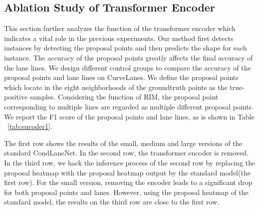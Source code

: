 \documentclass[10pt,twocolumn,letterpaper]{article}
\begin{document}
\subsection{Ablation Study of Transformer Encoder}

\begin{table}[h]
\centering
{}
\caption{Ablation study of the transformer encoder module on CurveLanes.}
\label{tab:encoder1}
\end{table}
This section further analyzes the function of the transformer encoder which indicates a vital role in the previous experiments. Our method first detects instances by detecting the proposal points and then predicts the shape for each instance. The accuracy of the proposal points greatly affects the final accuracy of the lane lines.
We design different control groups to compare the accuracy of the proposal points and lane lines on CurveLanes. We define the proposal points which locate in the eight neighborhoods of the groundtruth points as the true-positive samples. Considering the function of RIM, the proposal point corresponding to multiple lines are regarded as multiple different proposal points.
We report the F1 score of the proposal points and lane lines, as is shown in Table ~\ref{tab:encoder1}. 

The first row shows the results of the small, medium and large versions of the standard CondLaneNet. In the second row, the transformer encoder is removed. In the third row, we hack the inference process of the second row by replacing the proposal heatmap with the proposal heatmap output by the standard model(the first row). For the small version, removing the encoder leads to a significant drop for both proposal points and lanes. However, using the proposal heatmap of the standard model, the results on the third row are close to the first row. 
\end{document}
